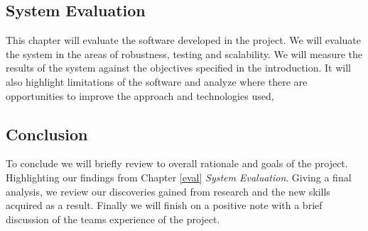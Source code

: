 \subsection{System Evaluation}
This chapter will evaluate the software developed in the project. We will evaluate the system in the areas of robustness, testing and scalability. We will measure the results of the system against the objectives specified in the introduction. It will also highlight limitations of the software and analyze where there are opportunities to improve the approach and technologies used,

\subsection{Conclusion}
To conclude we will briefly review to overall rationale and goals of the project. Highlighting our findings from  Chapter \ref{eval} \textit{System Evaluation}. Giving a final analysis, we review our discoveries gained from research and the new skills acquired as a result. Finally we will finish on a positive note with a brief discussion of the teams experience of the project.